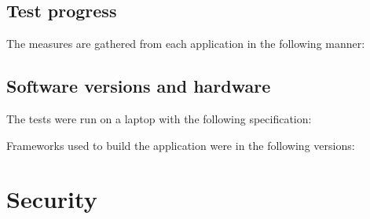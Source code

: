 
\subsection{Test progress}

The measures are gathered from each application in the following manner:



\subsection{Software versions and hardware}

The tests were run on a laptop with the following specification:



Frameworks used to build the application were in the following versions:



\section{Security}